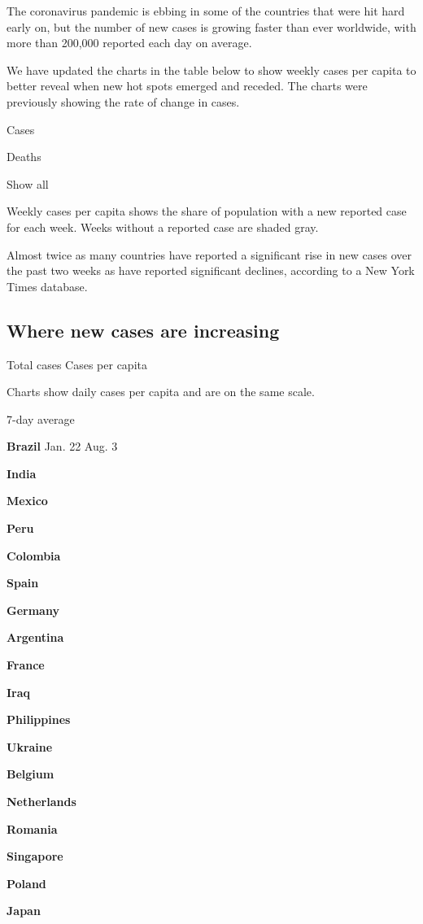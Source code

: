 The coronavirus pandemic is ebbing in some of the countries that were
hit hard early on, but the number of new cases is growing faster than
ever worldwide, with more than 200,000 reported each day on average.

We have updated the charts in the table below to show weekly cases per
capita to better reveal when new hot spots emerged and receded. The
charts were previously showing the rate of change in cases.

Cases

Deaths

Show all

Weekly cases per capita shows the share of population with a new
reported case for each week. Weeks without a reported case are shaded
gray.

Almost twice as many countries have reported a significant rise in new
cases over the past two weeks as have reported significant declines,
according to a New York Times database.

\hypertarget{where-new-cases-are-increasing}{%
\subsection{Where new cases are
increasing}\label{where-new-cases-are-increasing}}

Total cases Cases per capita

Charts show daily cases per capita and are on the same scale.

7-day average

\textbf{Brazil} Jan. 22 Aug. 3

\textbf{India}

\textbf{Mexico}

\textbf{Peru}

\textbf{Colombia}

\textbf{Spain}

\textbf{Germany}

\textbf{Argentina}

\textbf{France}

\textbf{Iraq}

\textbf{Philippines}

\textbf{Ukraine}

\textbf{Belgium}

\textbf{Netherlands}

\textbf{Romania}

\textbf{Singapore}

\textbf{Poland}

\textbf{Japan}

